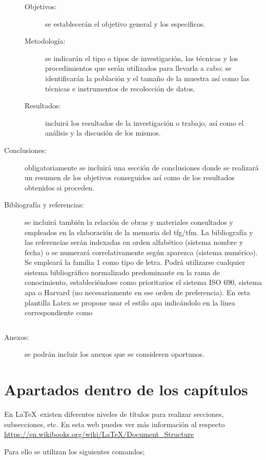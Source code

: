 \begin{description}
\begin{description}
\item[Objetivos:] se establecerán el objetivo general y los específicos.
\item[Metodología:] se indicarán el tipo o tipos de investigación, las técnicas y los procedimientos que serán utilizados para llevarla a cabo; se identificarán la población y el tamaño de la muestra así como las técnicas e instrumentos de recolección de datos.
\item[Resultados:] incluirá los resultados de la investigación o trabajo, así como el análisis y la discusión de los mismos.
\end{description}
\item[Conclusiones:] obligatoriamente se incluirá una sección de conclusiones donde se realizará un resumen de los objetivos conseguidos así como de los resultados obtenidos si proceden.
\item[Bibliografía y referencias:] se incluirá también la relación de obras y materiales consultados y empleados en la elaboración de la memoria del \gls{tfg}/\gls{tfm}. La bibliografía y las referencias serán indexadas en orden alfabético (sistema nombre y fecha) o se numerará correlativamente según aparezca (sistema numérico). Se empleará la familia 1 como tipo de letra. Podrá utilizarse cualquier sistema bibliográfico normalizado predominante en la rama de conocimiento, estableciéndose como prioritarios el sistema ISO 690, sistema \gls{apa}  o Harvard (no necesariamente en ese orden de preferencia). En esta plantilla Latex se propone usar el estilo \gls{apa} indicándolo en la línea correspondiente como 
\begin{verbatim}

\end{verbatim}


\item[Anexos:] se podrán incluir los anexos que se consideren oportunos.

\end{description}

\section{Apartados dentro de los capítulos}
En \LaTeX~existen diferentes niveles de títulos para realizar secciones, subsecciones, etc. En esta web puedes ver más información al respecto \url{https://en.wikibooks.org/wiki/LaTeX/Document_Structure}

Para ello se utilizan los siguientes comandos;

